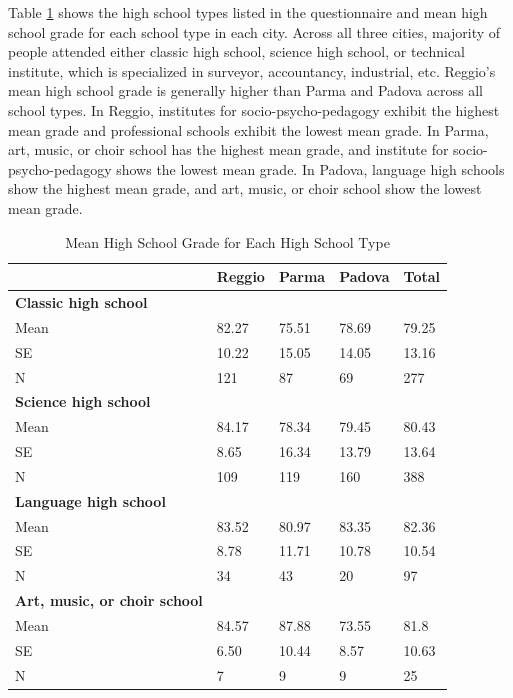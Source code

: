 Table \ref{tab:hsgrade} shows the high school types listed in the questionnaire and mean high school grade for each school type in each city. Across all three cities, majority of people attended either classic high school, science high school, or technical institute, which is specialized in surveyor, accountancy, industrial, etc. Reggio's mean high school grade is generally higher than Parma and Padova across all school types. In Reggio, institutes for socio-psycho-pedagogy exhibit the highest mean grade and professional schools exhibit the lowest mean grade. In Parma, art, music, or choir school has the highest mean grade, and institute for socio-psycho-pedagogy shows the lowest mean grade. In Padova, language high schools show the highest mean grade, and art, music, or choir school show the lowest mean grade.

\begin{table}[H]
\caption{Mean High School Grade for Each High School Type} \label{tab:hsgrade}
\begin{center}
\footnotesize
\begin{tabular}{lllll}
\toprule
  & \textbf{Reggio} & \textbf{Parma} & \textbf{Padova}  & \textbf{Total} \\ \midrule
\textbf{Classic high school}  \\
\quad Mean  & 82.27 &  75.51 &  78.69 & 79.25 \\ 
         \quad SE & 10.22 & 15.05 & 14.05 & 13.16 \\
         \quad N  &  121   &      87    &     69 &       277 \\

\textbf{Science high school} \\ 
 \quad Mean & 84.17 &  78.34 &      79.45 & 80.43 \\
  \quad SE & 8.65 & 16.34 & 13.79 & 13.64 \\
   \quad N  &       109   &     119    &    160   &      388 \\ 

\textbf{Language high school}  \\ 
 \quad Mean & 83.52  &  80.97   &   83.35  & 82.36 \\
 \quad SE & 8.78 & 11.71  & 10.78 & 10.54 \\
  \quad N &    34     &    43    &     20   &        97 \\ 

\textbf{Art, music, or choir school}  \\ 
 \quad Mean & 84.57 &  87.88 &  73.55 &      81.8 \\
  \quad SE & 6.50 &  10.44 &   8.57 & 10.63 \\
  \quad N &   7     &     9    &      9 &        25 \\ 


\end{tabular}
\end{center}
\end{table}
